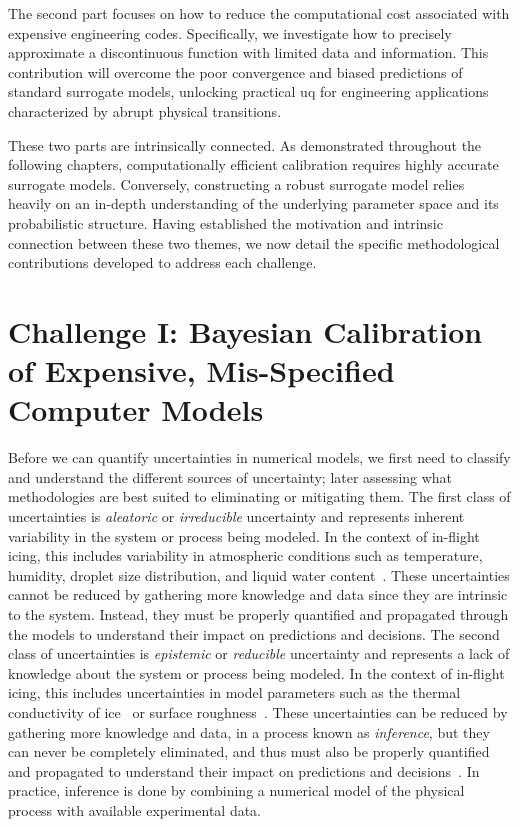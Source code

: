 \smallskip
The second part focuses on how to reduce the computational cost associated with expensive engineering codes. Specifically, we investigate how to precisely approximate a discontinuous function with limited data and information. This contribution will overcome the poor convergence and biased predictions of standard surrogate models, unlocking practical \gls{uq} for engineering applications characterized by abrupt physical transitions.

\smallskip
These two parts are intrinsically connected. As demonstrated throughout the following chapters, computationally efficient calibration requires highly accurate surrogate models. Conversely, constructing a robust surrogate model relies heavily on an in-depth understanding of the underlying parameter space and its probabilistic structure. Having established the motivation and intrinsic connection between these two themes, we now detail the specific methodological contributions developed to address each challenge.

\section{Challenge I: Bayesian Calibration of Expensive, Mis-Specified Computer Models}
\label{sec:intro:ch1}

Before we can quantify uncertainties in numerical models, we first need to classify and understand the different sources of uncertainty; later assessing what methodologies are best suited to eliminating or mitigating them. The first class of uncertainties is \textit{aleatoric} or \textit{irreducible} uncertainty and represents inherent variability in the system or process being modeled. In the context of in-flight icing, this includes variability in atmospheric conditions such as temperature, humidity, droplet size distribution, and liquid water content~\cite{Bellosta2021}. These uncertainties cannot be reduced by gathering more knowledge and data since they are intrinsic to the system. Instead, they must be properly quantified and propagated through the models to understand their impact on predictions and decisions. The second class of uncertainties is \textit{epistemic} or \textit{reducible} uncertainty and represents a lack of knowledge about the system or process being modeled. In the context of in-flight icing, this includes uncertainties in model parameters such as the thermal conductivity of ice~\cite{ice_1, ice_2} or surface roughness~\cite{ice_3}. These uncertainties can be reduced by gathering more knowledge and data, in a process known as \textit{inference}, but they can never be completely eliminated, and thus must also be properly quantified and propagated to understand their impact on predictions and decisions~\cite{uq_theory}. In practice, inference is done by combining a numerical model of the physical process with available experimental data.

